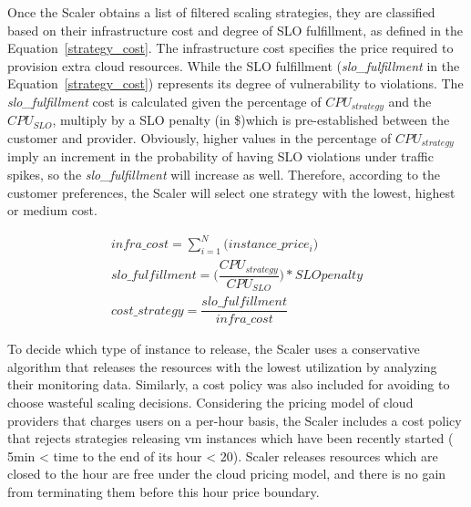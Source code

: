 

Once the Scaler obtains a list of filtered scaling strategies, they are classified based on their infrastructure cost and degree of SLO fulfillment, as defined in the Equation~\ref{strategy_cost}. The infrastructure cost specifies the price required to provision extra cloud resources. While the SLO fulfillment (\emph{slo\_fulfillment} in the Equation~\ref{strategy_cost}) represents its degree of vulnerability to violations. The \emph{slo\_fulfillment} cost is calculated given the percentage of \emph{$CPU_{strategy}$} and the \emph{$CPU_{SLO}$}, multiply by a SLO penalty (in \$)which is pre-established between the customer and provider. Obviously, higher values in the percentage of \emph{$CPU_{strategy}$} imply an increment in the probability of having SLO violations under traffic spikes, so the \emph{slo\_fulfillment} will increase as well. Therefore, according to the customer preferences, the Scaler will select one strategy with the lowest, highest or medium cost.

{\scriptsize
\begin{equation}\label{strategy_cost}
\begin{split}
infra\_cost = \sum_{i=1}^N \big( instance\_price_{i} \big) \\
slo\_fulfillment =  \bigg( \dfrac{ CPU_{strategy} } {CPU_{SLO}} \bigg) * SLO penalty \\
cost\_strategy = \dfrac{  slo\_fulfillment  } {infra\_cost}
\end{split}
\end{equation}
}

To decide which type of instance to release, the Scaler uses a conservative algorithm that releases the resources with the lowest utilization by analyzing their monitoring data. Similarly, a cost policy was also included for avoiding to choose wasteful scaling decisions. Considering the pricing model of cloud providers that charges users on a per-hour basis, the Scaler includes a cost policy that rejects strategies releasing vm instances which have been recently started ( 5min < time to the end of its hour < 20). Scaler releases resources which are closed to the hour are free under the cloud pricing model, and there is no gain from terminating them before this hour price boundary.


